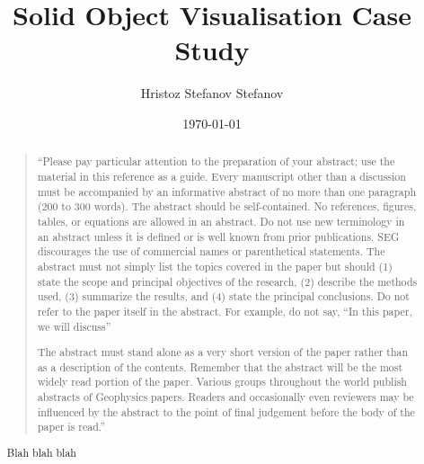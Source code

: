 \documentclass[]{report}   %
\begin{document}

\title{Solid Object Visualisation Case Study}

\author{Hristoz Stefanov Stefanov}
\date{\today}

\maketitle






\begin{abstract}

\begin{quotation}
	``Please pay particular attention to the preparation of your abstract; 
	use the material in this reference as a
	guide. Every manuscript other than a discussion must be accompanied by an informative abstract of no more than
	one paragraph (200 to 300 words). The abstract should be self-contained. No references, figures, tables, or
	equations are allowed in an abstract. Do not use new terminology in an abstract unless it is defined or is well
	known from prior publications. SEG discourages the use of commercial names or parenthetical statements. 
	The abstract must not simply list the topics covered in the paper but should (1) state the scope and principal
	objectives of the research, (2) describe the methods used, (3) summarize the results, and (4) state the principal
	conclusions. Do not refer to the paper itself in the abstract. For example, do not say, ``In this paper, we will
	discuss''

	The abstract must stand alone as a very short version of the paper rather than as a description of the contents.
	Remember that the abstract will be the most widely read portion of the paper. Various groups throughout the world
	publish abstracts of Geophysics papers. Readers and occasionally even reviewers may be influenced by the abstract
	to the point of final judgement before the body of the paper is read.''
\end{quotation}


Blah blah blah

\end{abstract}





\end{document}
